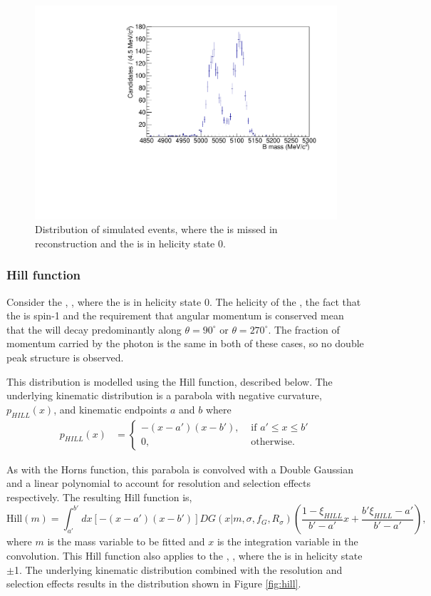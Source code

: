 \begin{figure}[h]
\centering
\includegraphics[width=0.5\linewidth]{figures/fitComponents/horns.pdf}
\caption{Distribution of simulated \decay{\Bm}{(\decay{\Dstarz}{\Dz\piz})\Kstarm} events, where the \piz is missed in reconstruction and the \Dstarz is in helicity state 0.}
\label{fig:horns}
\end{figure}

\subsubsection{Hill function}

Consider the \decay{\Bm}{\Dstarz\Kstarm}, \decay{\Dstarz}{\Dz\gamma}, where the \Dstarz is in helicity state 0. The helicity of the \Dstarz, the fact that the \Pgamma is spin-1 and the requirement that angular momentum is conserved mean that the \Pgamma will decay predominantly along $\theta = 90^{\circ}$ or $\theta = 270^{\circ}$. The fraction of momentum carried by the photon is the same in both of these cases, so no double peak structure is observed.

This distribution is modelled using the Hill function, described below. The underlying kinematic distribution is a parabola with negative curvature, $p_{HILL}(x)$, and kinematic endpoints $a$ and $b$ where
\begin{align}
p_{HILL}(x) &= \begin{cases}
-(x - a')(x - b'), & \text{ if $a' \leq x \leq b'$}\\ 	
0, & \text{ otherwise.}
\end{cases} 
\end{align}

As with the Horns function, this parabola is convolved with a Double Gaussian and a linear polynomial to account for resolution and selection effects respectively. The resulting Hill function is,
\begin{equation}
\text{Hill}(m) = \int_{a'}^{b'} dx \left[-(x - a')(x - b')\right] DG(x|m,\sigma,f_G,R_{\sigma}) \left( \frac{1 - \xi_{HILL}}{b' - a'}x + \frac{b'\xi_{HILL} - a'}{b' - a'}\right),
\label{eqn:hill}
\end{equation}
where $m$ is the mass variable to be fitted and $x$ is the integration variable in the convolution. This Hill function also applies to the \decay{\Bm}{\Dstarz\Kstarm}, \decay{\Dstarz}{\Dz\piz}, where the \Dstarz is in helicity state $\pm$1. The underlying kinematic distribution combined with the resolution and selection effects results in the distribution shown in Figure \ref{fig:hill}.

